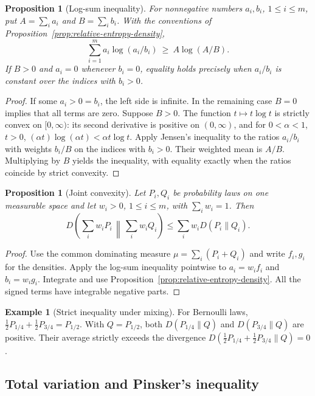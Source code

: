 \documentclass[11pt,oneside]{book}
\newtheorem{proposition}[theorem]{Proposition}
\theoremstyle{definition}
\newtheorem{example}[theorem]{Example}
\theoremstyle{remark}
\begin{document}
\begin{proposition}[Log-sum inequality]
\label{prop:log-sum-inequality}
For nonnegative numbers $a_i,b_i$, $1\leq i\leq m$, put
$A=\sum_i a_i$ and $B=\sum_i b_i$. With the conventions of
Proposition~\ref{prop:relative-entropy-density},
\[
\sum_{i=1}^m a_i\log(a_i/b_i)\ \geq\ A\log(A/B).
\]
If $B>0$ and $a_i=0$ whenever $b_i=0$, equality holds precisely when
$a_i/b_i$ is constant over the indices with $b_i>0$.
\end{proposition}
\begin{proof}
If some $a_i>0=b_i$, the left side is infinite. In the remaining
case $B=0$ implies that all terms are zero. Suppose $B>0$.
The function $t\mapsto t\log t$ is strictly convex on $[0,\infty)$:
its second derivative is positive on $(0,\infty)$, and for
$0<\alpha<1$, $t>0$,
$(\alpha t)\log(\alpha t)<\alpha t\log t$.
Apply Jensen's inequality to the ratios $a_i/b_i$ with weights
$b_i/B$ on the indices with $b_i>0$. Their weighted mean is $A/B$.
Multiplying by $B$ yields the inequality, with equality exactly
when the ratios coincide by strict convexity.
\end{proof}

\begin{proposition}[Joint convexity]
\label{prop:relative-entropy-joint-convexity}
Let $P_i,Q_i$ be probability laws on one measurable space and let
$w_i>0$, $1\leq i\leq m$, with $\sum_i w_i=1$. Then
\[
D\!\left(\sum_i w_i P_i\,\middle\|\,\sum_i w_i Q_i\right)
\leq\sum_i w_iD(P_i\|Q_i).
\]
\end{proposition}
\begin{proof}
Use the common dominating measure $\mu=\sum_i(P_i+Q_i)$ and
write $f_i,g_i$ for the densities. Apply the log-sum inequality
pointwise to $a_i=w_if_i$ and $b_i=w_ig_i$. Integrate and use
Proposition~\ref{prop:relative-entropy-density}. All the signed
terms have integrable negative parts.
\end{proof}

\begin{example}[Strict inequality under mixing]
\label{ex:strict-relative-entropy-convexity}
For Bernoulli laws, $\tfrac12P_{1/4}+\tfrac12P_{3/4}=P_{1/2}$.
With $Q=P_{1/2}$, both $D(P_{1/4}\|Q)$ and $D(P_{3/4}\|Q)$
are positive. Their average strictly exceeds the divergence
$D(\tfrac12P_{1/4}+\tfrac12P_{3/4}\|Q)=0$.
\end{example}

\subsection{Total variation and Pinsker's inequality}
\label{subsec:pinsker}
\end{document}
